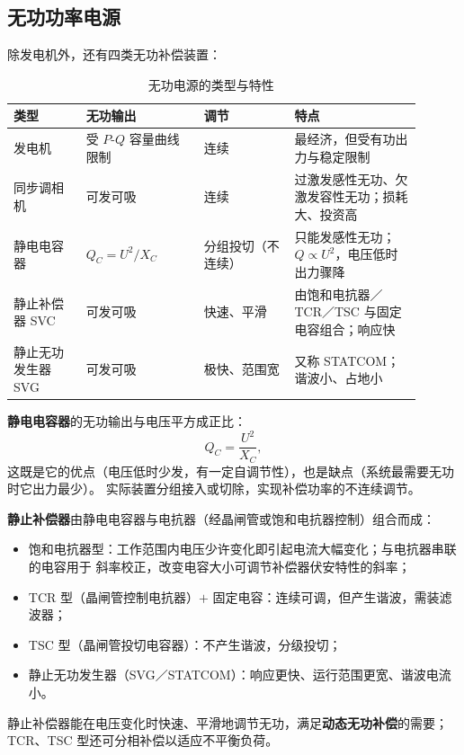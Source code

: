 \subsection{无功功率电源}

除发电机外，还有四类无功补偿装置：

\begin{table}[htbp]
  \centering
  \caption{无功电源的类型与特性}
  \small
  \begin{tabular}{@{}p{0.16\linewidth}p{0.26\linewidth}p{0.20\linewidth}p{0.28\linewidth}@{}}
    \toprule
    类型 & 无功输出 & 调节 & 特点 \\
    \midrule
    发电机 & 受 $P$-$Q$ 容量曲线限制 & 连续 & 最经济，但受有功出力与稳定限制 \\
    同步调相机 & 可发可吸 & 连续 & 过激发感性无功、欠激发容性无功；损耗大、投资高 \\
    静电电容器 & $Q_C=U^{2}/X_C$ & 分组投切（不连续） & 只能发感性无功；$Q\propto U^{2}$，电压低时出力骤降 \\
    静止补偿器 SVC & 可发可吸 & 快速、平滑 & 由饱和电抗器／TCR／TSC 与固定电容组合；响应快 \\
    静止无功发生器 SVG & 可发可吸 & 极快、范围宽 & 又称 STATCOM；谐波小、占地小 \\
    \bottomrule
  \end{tabular}
\end{table}

\textbf{静电电容器}的无功输出与电压平方成正比：
\begin{equation}
  Q_C=\frac{U^{2}}{X_C},
\end{equation}
这既是它的优点（电压低时少发，有一定自调节性），也是缺点（系统最需要无功时它出力最少）。
实际装置分组接入或切除，实现补偿功率的不连续调节。

\textbf{静止补偿器}由静电电容器与电抗器（经晶闸管或饱和电抗器控制）组合而成：
\begin{itemize}
  \item 饱和电抗器型：工作范围内电压少许变化即引起电流大幅变化；与电抗器串联的电容用于
        斜率校正，改变电容大小可调节补偿器伏安特性的斜率；
  \item TCR 型（晶闸管控制电抗器）$+$ 固定电容：连续可调，但产生谐波，需装滤波器；
  \item TSC 型（晶闸管投切电容器）：不产生谐波，分级投切；
  \item 静止无功发生器（SVG／STATCOM）：响应更快、运行范围更宽、谐波电流小。
\end{itemize}
静止补偿器能在电压变化时快速、平滑地调节无功，满足\textbf{动态无功补偿}的需要；
TCR、TSC 型还可分相补偿以适应不平衡负荷。

